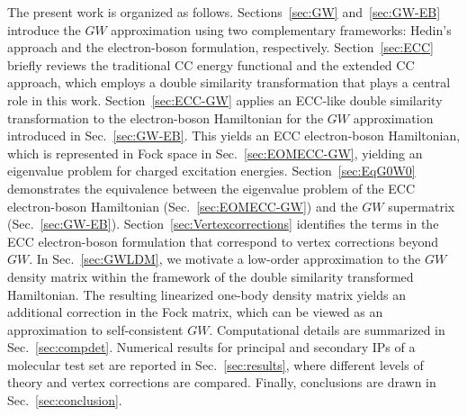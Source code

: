 \documentclass[aip,jcp,reprint,noshowkeys,superscriptaddress]{revtex4-2}
\begin{document}
The present work is organized as follows. 
Sections~\ref{sec:GW} and~\ref{sec:GW-EB} introduce the $GW$ approximation using two complementary frameworks: Hedin's approach and the electron-boson formulation, respectively. 
Section~\ref{sec:ECC} briefly reviews the traditional CC energy functional and the extended CC approach, which employs a double similarity transformation that plays a central role in this work. 
Section~\ref{sec:ECC-GW} applies an ECC-like double similarity transformation to the electron-boson Hamiltonian for the $GW$ approximation introduced in Sec.~\ref{sec:GW-EB}.
This yields an ECC electron-boson Hamiltonian, which is represented in Fock space in Sec.~\ref{sec:EOMECC-GW}, yielding an eigenvalue problem for charged excitation energies. 
Section~\ref{sec:EqG0W0} demonstrates the equivalence between the eigenvalue problem of the ECC electron-boson Hamiltonian (Sec.~\ref{sec:EOMECC-GW}) and the $GW$ supermatrix (Sec.~\ref{sec:GW-EB}). 
Section~\ref{sec:Vertexcorrections} identifies the terms in the ECC electron-boson formulation that correspond to vertex corrections beyond $GW$.
In Sec.~\ref{sec:GWLDM}, we motivate a low-order approximation to the $GW$ density matrix within the framework of the double similarity transformed Hamiltonian. 
The resulting linearized one-body density matrix yields an additional correction in the Fock matrix, which can be viewed as an approximation to self-consistent $GW$.
Computational details are summarized in Sec.~\ref{sec:compdet}. 
Numerical results for principal and secondary IPs of a molecular test set are reported in Sec.~\ref{sec:results}, where different levels of theory and vertex corrections are compared. 
Finally, conclusions are drawn in Sec.~\ref{sec:conclusion}.

\end{document}
